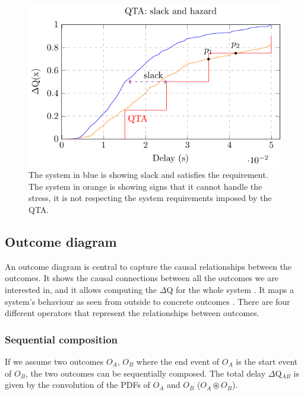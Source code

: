         \begin{figure}[H]
            \begin{center}
                \includegraphics[scale=1]{tikz/cdf_qta_slack.pdf}
            \end{center}
            \caption{The system in blue is showing slack and satisfies the requirement. The system in orange is showing signs that it cannot handle the stress, it is not respecting the system requirements imposed by the QTA.}%
        \end{figure}

    \subsection{Outcome diagram}
        An outcome diagram is central to capture the causal relationships between the outcomes. It shows the causal connections between all the outcomes we are interested in, and it allows computing the $\Delta$Q for the whole system \cite{dq-tut}. It maps a system's behaviour as seen from outside to concrete outcomes \cite{art}.
        There are four different operators that represent the relationships between outcomes. \cite{dq-tut}

    \subsubsection{Sequential composition}
        If we assume two outcomes $O_A$, $O_B$ where the end event of $O_A$ is the start event of $O_B$, the two outcomes can be sequentially composed. The total delay $\Delta$Q$_{AB}$ is given by the convolution of the PDFs of $O_A$ and $O_B$ ($O_A \circledast O_B$).
        

